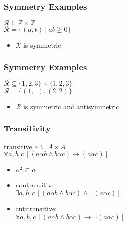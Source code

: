 \documentclass[dvipsnames]{beamer}
\begin{document}
\begin{frame}
  \frametitle{Symmetry Examples}

  \begin{example}
    $\mathcal{R} \subseteq \mathbb{Z} \times \mathbb{Z}$\\
    $\mathcal{R} = \{(a,b)~|~ab \geq 0\}$

    \medskip
    \begin{itemize}
      \item $\mathcal{R}$ is symmetric
    \end{itemize}
  \end{example}
\end{frame}

\begin{frame}
  \frametitle{Symmetry Examples}

  \begin{example}
    $\mathcal{R} \subseteq \{1,2,3\} \times \{1,2,3\}$\\
    $\mathcal{R} = \{(1,1), (2,2)\}$

    \begin{itemize}
      \item $\mathcal{R}$ is symmetric and antisymmetric
    \end{itemize}
  \end{example}
\end{frame}

\begin{frame}
  \frametitle{Transitivity}

  \begin{block}{transitive}
    $\alpha \subseteq A \times A$\\
    $\forall a,b,c~[(a \alpha b \wedge b \alpha c) \rightarrow (a \alpha c)]$
  \end{block}

  \pause
  \begin{itemize}
    \item $\alpha^2 \subseteq \alpha$

    \pause
    \item nontransitive:\\
      $\exists a,b,c~[(a \alpha b \wedge b \alpha c) \wedge \neg (a \alpha c)]$

    \pause
    \item antitransitive:\\
      $\forall a,b,c~[(a \alpha b \wedge b \alpha c) \rightarrow \neg (a \alpha c)]$
  \end{itemize}
\end{frame}
\end{document}
